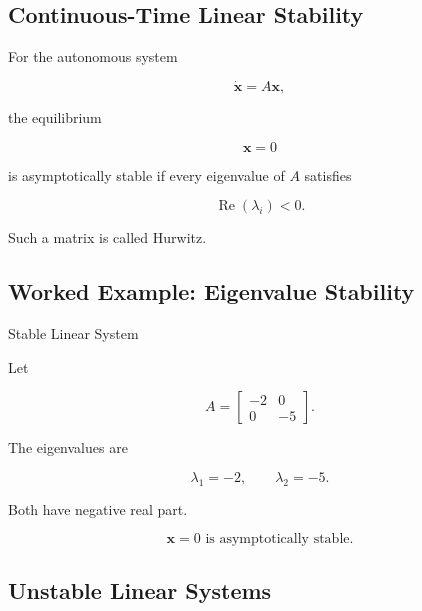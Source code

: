 \subsection{Continuous-Time Linear Stability}
\label{subsec:continuous-linear-stability}

For the autonomous system

\[
\dot{\mathbf{x}}
=
A\mathbf{x},
\]

the equilibrium

\[
\mathbf{x}=0
\]

is asymptotically stable if every eigenvalue of \(A\) satisfies

\[
\boxed{
\operatorname{Re}(\lambda_i)<0.
}
\]

Such a matrix is called Hurwitz.

\subsection{Worked Example: Eigenvalue Stability}
\label{subsec:worked-eigenvalue-stability}

\begin{workedexamplebox}{Stable Linear System}

Let

\[
A
=
\begin{bmatrix}
-2 & 0\\
0 & -5
\end{bmatrix}.
\]

The eigenvalues are

\[
\lambda_1=-2,
\qquad
\lambda_2=-5.
\]

Both have negative real part.

\begin{answerbox}
\[
\boxed{
\mathbf{x}=0
\text{ is asymptotically stable}.
}
\]
\end{answerbox}

\end{workedexamplebox}

\subsection{Unstable Linear Systems}
\label{subsec:unstable-linear-systems}

